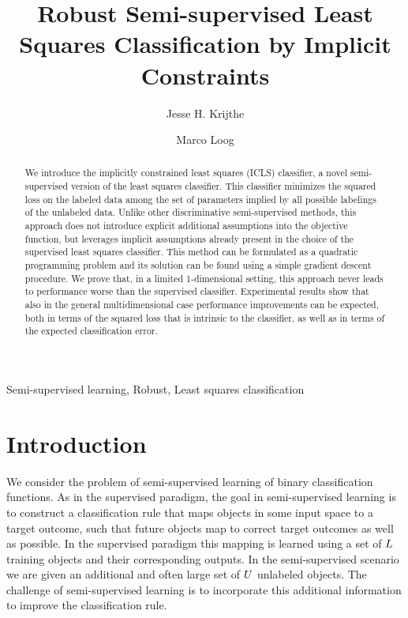 \documentclass{elsarticle}
\begin{document}
\begin{frontmatter}
\date{}
\title{Robust Semi-supervised Least Squares Classification by Implicit Constraints}

\author[prlab,molepi]{Jesse H. Krijthe}

\author[prlab,imagegroup]{Marco Loog}


\address[prlab]{Pattern Recognition Laboratory, Delft University of Technology, Mekelweg 4, 2628CD Delft, The Netherlands}
\address[molepi]{Department of Molecular Epidemiology, Leiden University Medical Center, Einthovenweg 20, 2333ZC Leiden, The Netherlands}
\address[imagegroup]{Image Group, University of Copenhagen, Universitetsparken 5, DK-2100, Denmark}

\begin{abstract}
We introduce the implicitly constrained least squares (ICLS) classifier, a novel semi-supervised version of the least squares classifier. This classifier minimizes the squared loss on the labeled data among the set of parameters implied by all possible labelings of the unlabeled data.
Unlike other discriminative semi-supervised methods, this approach does not introduce explicit additional assumptions into the objective function, but leverages implicit assumptions already present in the choice of the supervised least squares classifier.
This method can be formulated as a quadratic programming problem and its solution can be found using a simple gradient descent procedure. 
We prove that, in a limited 1-dimensional setting, this approach never leads to performance worse than the supervised classifier.
Experimental results show that also in the general multidimensional case performance improvements can be expected, both in terms of the squared loss that is intrinsic to the classifier, as well as in terms of the expected classification error.
\end{abstract}

\begin{keyword}
Semi-supervised learning, Robust, Least squares classification
\end{keyword}

\end{frontmatter}

\section{Introduction}
We consider the problem of semi-supervised learning of binary classification functions. As in the supervised paradigm, the goal in semi-supervised learning is to construct a classification rule that maps objects in some input space to a target outcome, such that future objects map to correct target outcomes as well as possible. In the supervised paradigm this mapping is learned using a set of $L$ training objects and their corresponding outputs. In the semi-supervised scenario we are given an additional and often large set of $U$ unlabeled objects. The challenge of semi-supervised learning is to incorporate this additional information to improve the classification rule.
\end{document}
